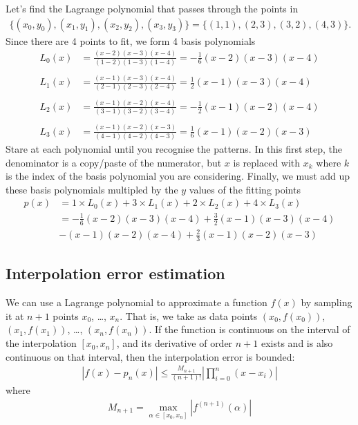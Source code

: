 \exemple{\upline}
{
	Let's find the Lagrange polynomial that passes through the points in 
	\begin{align*}
	\{(x_0,y_0),(x_1,y_1),(x_2,y_2),(x_3,y_3)\}=\{(1,1),(2,3),(3,2),(4,3)\}.
	\end{align*}
	Since there are 4 points to fit, we form 4 basis polynomials
	\begin{align*}
	L_0(x) &= \frac{(x-2)(x-3)(x-4)}{(1-2)(1-3)(1-4)}  = -\frac{1}{6}(x-2)(x-3)(x-4) \\ \\
	L_1(x) &= \frac{(x-1)(x-3)(x-4)}{(2-1)(2-3)(2-4)}  =  \frac{1}{2}(x-1)(x-3)(x-4) \\ \\
	L_2(x) &= \frac{(x-1)(x-2)(x-4)}{(3-1)(3-2)(3-4)}  = -\frac{1}{2}(x-1)(x-2)(x-4) \\ \\
	L_3(x) &= \frac{(x-1)(x-2)(x-3)}{(4-1)(4-2)(4-3)}  =  \frac{1}{6}(x-1)(x-2)(x-3)
	\end{align*} 
	Stare at each polynomial until you recognise the patterns. In this first step, the denominator is a copy/paste of the numerator, but $x$ is replaced with $x_k$ where $k$ is the index of the basis polynomial you are considering. Finally, we must add up these basis polynomials multipled by the $y$ values of the fitting points
	\begin{align*}
	p(x) &= 1\times L_0(x) + 3\times L_1(x) + 2\times L_2(x) + 4\times L_3(x)  \\
	 &= -\frac{1}{6}(x-2)(x-3)(x-4) + \frac{3}{2}(x-1)(x-3)(x-4) \\
		& - (x-1)(x-2)(x-4) + \frac{2}{3}(x-1)(x-2)(x-3)
	\end{align*}
}{\downline}




\subsection{Interpolation error estimation}
We can use a Lagrange polynomial to approximate a function $f(x)$ by sampling it at $n+1$ points $x_0$, \dots, $x_n$. That is, we take as data points $(x_0,f(x_0))$, $(x_1,f(x_1))$, \dots, $(x_n,f(x_n))$. If the function is continuous on the interval of the interpolation $[x_0,x_n]$, and its derivative of order $n+1$ exists and is also continuous on that interval, then the interpolation error is bounded:
\begin{align*}
|f(x) - p_n(x)| \leq \frac{M_{n+1}}{(n+1)!} \left| \prod_{i=0}^n (x-x_i) \right|
\end{align*}
where 
\begin{align*}
M_{n+1} = \max_{\alpha \in [x_0,x_n]} \left| f^{(n+1)}(\alpha)\right|
\end{align*}

